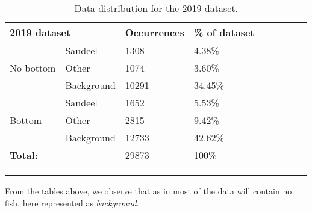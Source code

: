 \begin{longtable}{lllllllll}
\caption[2019 data distribution]{Data distribution for the 2019 dataset.}
\\ \cline{1-4}
\multicolumn{2}{|l|}{\textbf{2019 dataset}} & \multicolumn{1}{l|}{Occurrences} & \multicolumn{1}{l|}{\% of dataset} &  &  &  &  &  \\ \cline{1-4}
\endfirsthead
%
\endhead
%
                     & Sandeel              & 1308                             & 4.38\%                             &  &  &  &  &  \\
No bottom            & Other                & 1074                             & 3.60\%                             &  &  &  &  &  \\
                     & Background           & 10291                            & 34.45\%                            &  &  &  &  &  \\ \cline{1-4}
                     & Sandeel              & 1652                             & 5.53\%                             &  &  &  &  &  \\
Bottom               & Other                & 2815                             & 9.42\%                             &  &  &  &  &  \\
                     & Background           & 12733                            & 42.62\%                            &  &  &  &  &  \\ \cline{1-4}
\multicolumn{2}{l}{\textbf{Total:}}         & 29873                            & 100\%                              &  &  &  &  &  \\ \cline{1-4}
                     &                      &                                  &                                    &  &  &  &  &  \\
                     &                      &                                  &                                    &  &  &  &  & 
\\ \label{data_distribution_2019_table}
\end{longtable}  

        From the tables above, we observe that as in \citeauthor{brautaset2020acoustic}\cite{brautaset2020acoustic} most of the data will contain no fish, here represented as \textit{background}.

\clearpage
